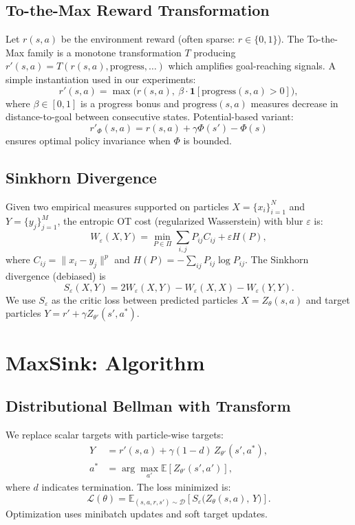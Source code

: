 \documentclass{article}
\begin{document}
\subsection{To-the-Max Reward Transformation}
Let $r(s,a)$ be the environment reward (often sparse: $r\in\{0,1\}$). The To-the-Max family is a monotone transformation $T$ producing $r'(s,a)=T(r(s,a),\text{progress},\ldots)$ which amplifies goal-reaching signals. A simple instantiation used in our experiments:
\begin{equation}
r'(s,a) = \max\big(r(s,a),\ \beta\cdot \mathbf{1}[\text{progress}(s,a)>0]\big),
\label{eq:to_max}
\end{equation}
where $\beta\in[0,1]$ is a progress bonus and $\text{progress}(s,a)$ measures decrease in distance-to-goal between consecutive states. Potential-based variant:
\begin{equation}
r'_{\Phi}(s,a) = r(s,a) + \gamma\Phi(s') - \Phi(s)
\label{eq:potential_shaping}
\end{equation}
ensures optimal policy invariance \cite{ng1999policy} when $\Phi$ is bounded.

\subsection{Sinkhorn Divergence}
Given two empirical measures supported on particles $X=\{x_i\}_{i=1}^N$ and $Y=\{y_j\}_{j=1}^M$, the entropic OT cost (regularized Wasserstein) with blur $\varepsilon$ is:
\begin{equation}
W_\varepsilon(X,Y) = \min_{P\in\Pi}\sum_{i,j} P_{ij}C_{ij} + \varepsilon H(P),
\end{equation}
where $C_{ij}=\|x_i-y_j\|^p$ and $H(P)=-\sum_{ij}P_{ij}\log P_{ij}$. The Sinkhorn divergence (debiased) is
\begin{equation}
S_\varepsilon(X,Y) = 2W_\varepsilon(X,Y) - W_\varepsilon(X,X) - W_\varepsilon(Y,Y).
\label{eq:sinkhorn}
\end{equation}
We use $S_\varepsilon$ as the critic loss between predicted particles $X=Z_\theta(s,a)$ and target particles $Y=r' + \gamma Z_{\theta'}(s',a^*)$.

\section{MaxSink: Algorithm}
\subsection{Distributional Bellman with Transform}
We replace scalar targets with particle-wise targets:
\begin{align}
Y &= r'(s,a) + \gamma (1-d)\, Z_{\theta'}(s', a^*),\\
a^*&=\arg\max_{a'}\mathbb{E}[Z_{\theta'}(s',a')],
\end{align}
where $d$ indicates termination. The loss minimized is:
\begin{equation}
\mathcal{L}(\theta) = \mathbb{E}_{(s,a,r,s')\sim\mathcal{D}}\left[S_\varepsilon\big(Z_\theta(s,a),\,Y\big)\right].
\end{equation}
Optimization uses minibatch updates and soft target updates.
\end{document}
